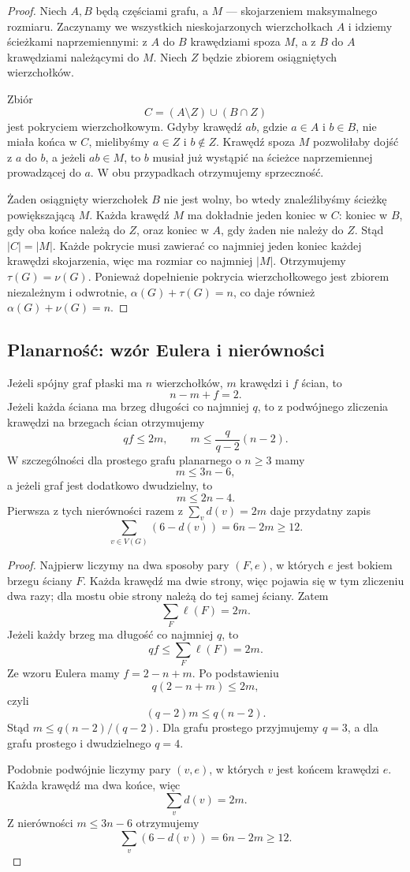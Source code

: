 \documentclass{lecture-kuznia}
\newenvironment{theoryproof}{\begin{proof}}{\end{proof}}
\begin{document}
\begin{theoryproof}
	Niech $A,B$ będą częściami grafu, a $M$ --- skojarzeniem maksymalnego
	rozmiaru. Zaczynamy we wszystkich nieskojarzonych wierzchołkach $A$ i
	idziemy ścieżkami naprzemiennymi: z $A$ do $B$ krawędziami spoza $M$, a z
	$B$ do $A$ krawędziami należącymi do $M$. Niech $Z$ będzie zbiorem
	osiągniętych wierzchołków.

	Zbiór
	\[
		C=(A\setminus Z)\cup(B\cap Z)
	\]
	jest pokryciem wierzchołkowym. Gdyby krawędź $ab$, gdzie $a\in A$ i
	$b\in B$, nie miała końca w $C$, mielibyśmy $a\in Z$ i $b\notin Z$.
	Krawędź spoza $M$ pozwoliłaby dojść z $a$ do $b$, a jeżeli $ab\in M$, to
	$b$ musiał już wystąpić na ścieżce naprzemiennej prowadzącej do $a$.
	W obu przypadkach otrzymujemy sprzeczność.

	Żaden osiągnięty wierzchołek $B$ nie jest wolny, bo wtedy znaleźlibyśmy
	ścieżkę powiększającą $M$. Każda krawędź $M$ ma dokładnie jeden koniec w
	$C$: koniec w $B$, gdy oba końce należą do $Z$, oraz koniec w $A$, gdy żaden
	nie należy do $Z$. Stąd $|C|=|M|$. Każde pokrycie musi zawierać co najmniej
	jeden koniec każdej krawędzi skojarzenia, więc ma rozmiar co najmniej
	$|M|$. Otrzymujemy $\tau(G)=\nu(G)$. Ponieważ dopełnienie pokrycia
	wierzchołkowego jest zbiorem niezależnym i odwrotnie,
	$\alpha(G)+\tau(G)=n$, co daje również $\alpha(G)+\nu(G)=n$.
\end{theoryproof}

\subsection{Planarność: wzór Eulera i nierówności}

Jeżeli spójny graf płaski ma $n$ wierzchołków, $m$ krawędzi i $f$ ścian, to
\[
	n-m+f=2.
\]
Jeżeli każda ściana ma brzeg długości co najmniej $q$, to z podwójnego
zliczenia krawędzi na brzegach ścian otrzymujemy
\[
	qf\leqslant2m,
	\qquad
	m\leqslant\frac{q}{q-2}(n-2).
\]
W szczególności dla prostego grafu planarnego o $n\geqslant3$ mamy
\[
	m\leqslant3n-6,
\]
a jeżeli graf jest dodatkowo dwudzielny, to
\[
	m\leqslant2n-4.
\]
Pierwsza z tych nierówności razem z $\sum_vd(v)=2m$ daje przydatny zapis
\[
	\sum_{v\in V(G)}(6-d(v))=6n-2m\geqslant12.
\]

\begin{theoryproof}
	Najpierw liczymy na dwa sposoby pary $(F,e)$, w których $e$ jest bokiem
	brzegu ściany $F$. Każda krawędź ma dwie strony, więc pojawia się w tym
	zliczeniu dwa razy; dla mostu obie strony należą do tej samej ściany. Zatem
	\[
		\sum_F\ell(F)=2m.
	\]
	Jeżeli każdy brzeg ma długość co najmniej $q$, to
	\[
		qf\leqslant\sum_F\ell(F)=2m.
	\]
	Ze wzoru Eulera mamy $f=2-n+m$. Po podstawieniu
	\[
		q(2-n+m)\leqslant2m,
	\]
	czyli
	\[
		(q-2)m\leqslant q(n-2).
	\]
	Stąd $m\leqslant q(n-2)/(q-2)$. Dla grafu prostego przyjmujemy $q=3$, a
	dla grafu prostego i dwudzielnego $q=4$.

	Podobnie podwójnie liczymy pary $(v,e)$, w których $v$ jest końcem krawędzi
	$e$. Każda krawędź ma dwa końce, więc
	\[
		\sum_vd(v)=2m.
	\]
	Z nierówności $m\leqslant3n-6$ otrzymujemy
	\[
		\sum_v(6-d(v))=6n-2m\geqslant12.
	\]
\end{theoryproof}
\end{document}
